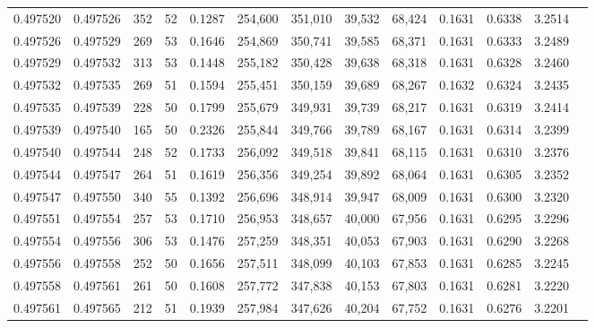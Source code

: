 \begin{tabular}{rrrrrrrrrrrrr}
0.497520 & 0.497526 & 352 &  52 &                                     0.1287 & 254,600 & 351,010 &  39,532 &  68,424 & 0.1631 & 0.6338 & 3.2514 \\
0.497526 & 0.497529 & 269 &  53 &                                     0.1646 & 254,869 & 350,741 &  39,585 &  68,371 & 0.1631 & 0.6333 & 3.2489 \\
0.497529 & 0.497532 & 313 &  53 &                                     0.1448 & 255,182 & 350,428 &  39,638 &  68,318 & 0.1631 & 0.6328 & 3.2460 \\
0.497532 & 0.497535 & 269 &  51 &                                     0.1594 & 255,451 & 350,159 &  39,689 &  68,267 & 0.1632 & 0.6324 & 3.2435 \\
0.497535 & 0.497539 & 228 &  50 &                                     0.1799 & 255,679 & 349,931 &  39,739 &  68,217 & 0.1631 & 0.6319 & 3.2414 \\
0.497539 & 0.497540 & 165 &  50 &                                     0.2326 & 255,844 & 349,766 &  39,789 &  68,167 & 0.1631 & 0.6314 & 3.2399 \\
0.497540 & 0.497544 & 248 &  52 &                                     0.1733 & 256,092 & 349,518 &  39,841 &  68,115 & 0.1631 & 0.6310 & 3.2376 \\
0.497544 & 0.497547 & 264 &  51 &                                     0.1619 & 256,356 & 349,254 &  39,892 &  68,064 & 0.1631 & 0.6305 & 3.2352 \\
0.497547 & 0.497550 & 340 &  55 &                                     0.1392 & 256,696 & 348,914 &  39,947 &  68,009 & 0.1631 & 0.6300 & 3.2320 \\
0.497551 & 0.497554 & 257 &  53 &                                     0.1710 & 256,953 & 348,657 &  40,000 &  67,956 & 0.1631 & 0.6295 & 3.2296 \\
0.497554 & 0.497556 & 306 &  53 &                                     0.1476 & 257,259 & 348,351 &  40,053 &  67,903 & 0.1631 & 0.6290 & 3.2268 \\
0.497556 & 0.497558 & 252 &  50 &                                     0.1656 & 257,511 & 348,099 &  40,103 &  67,853 & 0.1631 & 0.6285 & 3.2245 \\
0.497558 & 0.497561 & 261 &  50 &                                     0.1608 & 257,772 & 347,838 &  40,153 &  67,803 & 0.1631 & 0.6281 & 3.2220 \\
0.497561 & 0.497565 & 212 &  51 &                                     0.1939 & 257,984 & 347,626 &  40,204 &  67,752 & 0.1631 & 0.6276 & 3.2201 \\

\end{tabular}
